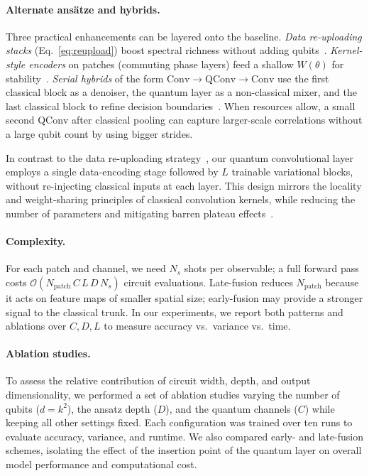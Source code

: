 \paragraph{Alternate ans\"atze and hybrids.}
Three practical enhancements can be layered onto the baseline. \emph{Data re-uploading stacks} (Eq.~\ref{eq:reupload}) boost spectral richness without adding qubits~\cite{PerezSalinas2020,Schuld2020Expressivity}. \emph{Kernel-style encoders} on patches (commuting phase layers) feed a shallow $W(\theta)$ for stability~\cite{Havlicek2019}. \emph{Serial hybrids} of the form $\mathrm{Conv}\!\to\!\mathrm{QConv}\!\to\!\mathrm{Conv}$ use the first classical block as a denoiser, the quantum layer as a non-classical mixer, and the last classical block to refine decision boundaries~\cite{LeCun1998}.
When resources allow, a small second $\mathrm{QConv}$ after classical pooling can capture larger-scale correlations without a large qubit count by using bigger strides.

In contrast to the data re-uploading strategy~\cite{PerezSalinas2020}, 
our quantum convolutional layer employs a single data-encoding stage followed by $L$ trainable variational blocks, 
without re-injecting classical inputs at each layer.
This design mirrors the locality and weight-sharing principles of classical convolution kernels,
while reducing the number of parameters and mitigating barren plateau effects~\cite{cerezo2021}.


\paragraph{Complexity.}
For each patch and channel, we need $N_s$ shots per observable; a full forward pass costs $\mathcal{O}(N_{\mathrm{patch}}\,C\,L\,D\,N_s)$ circuit evaluations. Late-fusion reduces $N_{\mathrm{patch}}$ because it acts on feature maps of smaller spatial size; early-fusion may provide a stronger signal to the classical trunk. In our experiments, we report both patterns and ablations over $C, D, L$ to measure accuracy vs.\ variance vs.\ time.
\paragraph{Ablation studies.}
To assess the relative contribution of circuit width, depth, and output dimensionality,
we performed a set of ablation studies varying the number of qubits ($d=k^2$), 
the ansatz depth ($D$), and the quantum channels ($C$) while keeping all other settings fixed. 
Each configuration was trained over ten runs to evaluate accuracy, variance, and runtime. 
We also compared early- and late-fusion schemes, isolating the effect of the 
insertion point of the quantum layer on overall model performance and computational cost.


